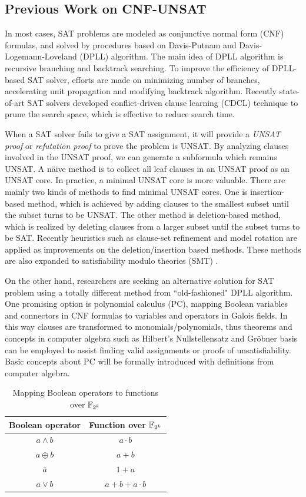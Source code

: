 \subsection{Previous Work on CNF-UNSAT}
In most cases, SAT problems are modeled as conjunctive normal form (CNF) formulas, and solved by procedures based on 
Davis-Putnam and Davis-Logemann-Loveland (DPLL) algorithm. The main idea of DPLL algorithm
is recursive branching and backtrack searching. To improve the efficiency of DPLL-based
SAT solver, efforts are made on minimizing number of branches, accelerating unit propagation
and modifying backtrack algorithm. Recently state-of-art SAT solvers developed conflict-driven
clause learning (CDCL) technique to prune the search space, which is effective to reduce
search time.

When a SAT solver fails to give a SAT assignment, it will provide a {\it UNSAT proof} or {\it refutation proof}
to prove the problem is UNSAT. By analyzing clauses involved in the UNSAT proof, we can 
generate a subformula which remains UNSAT. A n\"aive method is to collect all leaf 
clauses in an UNSAT proof as an UNSAT core. In practice, a minimal UNSAT core is more valuable.
There are mainly two kinds of methods to find minimal UNSAT cores.
One is insertion-based method, which is achieved by adding clauses to the smallest subset 
until the subset turns to be UNSAT. The other method is deletion-based method,
which is realized by deleting clauses from a larger subset until the subset turns to be SAT.
Recently heuristics such as clause-set refinement \cite{modelrotation} and model rotation \cite{belov2011accelerating}
are applied as improvements on the deletion/insertion based methods.
These methods are also expanded to satisfiability modulo theories (SMT) \cite{cimatti2007simple}.

On the other hand, researchers are seeking an alternative solution for SAT problem using a totally
different method from ``old-fashioned" DPLL algorithm. One promising option is polynomial calculus (PC),
mapping Boolean variables and connectors in CNF formulas to variables and operators in 
Galois fields. In this way clauses are transformed to monomials/polynomials, thus theorems and concepts in computer
algebra such as Hilbert's Nullstellensatz and Gr\"obner basis can be employed to assist finding
valid assignments or proofs of unsatisfiability. Basic concepts about PC will be formally introduced with definitions
from computer algebra.

\begin{table}[h]
\caption{Mapping Boolean operators to functions over ${\mathbb{F}}_{2^k}$}
\centering
\begin{tabular}{|c|c|} 
\hline
 Boolean operator & Function over ${\mathbb{F}}_{2^k}$ \\
\hline
\hline
 $a\land b$ & $a\cdot b$ \\
\hline
 $a\oplus b$ & $a+b$ \\
\hline
 $\bar{a}$ & $1+a$ \\
\hline
 $a\lor b$ & $a+b+a\cdot b$\\
\hline
\end{tabular}
\label{tab:booltof4}  
\end{table}

